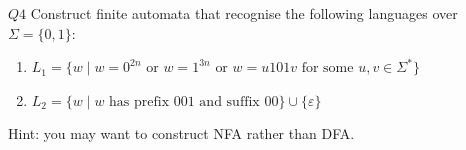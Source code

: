 \documentclass{article}
\theoremstyle{definition}
\theoremstyle{definition}
\theoremstyle{remark}
\begin{document}
\begin{questionbox}{$Q4$}
    Construct finite automata that recognise the following languages over $\Sigma=\{0,1\}$:
    \begin{enumerate}
        \item[$(i)$] $L_1=\{w\mid w=0^{2n}\text{ or }w=1^{3n}\text{ or }w=u101v\text{ for some }u,v\in\Sigma^\ast\}$
        
        \item[$(ii)$] $L_2=\{w\mid w\text{ has prefix 001 and suffix 00}\}\cup\{\varepsilon\}$
    \end{enumerate}
    Hint: you may want to construct NFA rather than DFA.
\end{questionbox}

\bigskip
\end{document}
